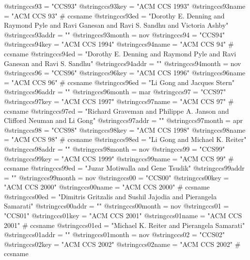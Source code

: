 @string{ccs93 =                 "CCS93"}
@string{ccs93key =              "ACM CCS 1993"}
@string{ccs93name =             "ACM CCS 93" # ccsname}
@string{ccs93ed =               "Dorothy E. Denning and Raymond Pyle and Ravi Ganesan and Ravi S. Sandhu and Victoria Ashby"}
@string{ccs93addr =             ""}
@string{ccs93month =            nov}
@string{ccs94 =                 "CCS94"}
@string{ccs94key =              "ACM CCS 1994"}
@string{ccs94name =             "ACM CCS 94" # ccsname}
@string{ccs94ed =               "Dorothy E. Denning and Raymond Pyle and Ravi Ganesan and Ravi S. Sandhu"}
@string{ccs94addr =             ""}
@string{ccs94month =            nov}
@string{ccs96 =                 "CCS96"}
@string{ccs96key =              "ACM CCS 1996"}
@string{ccs96name =             "ACM CCS 96" # ccsname}
@string{ccs96ed =               "Li Gong and Jacques Stern"}
@string{ccs96addr =             ""}
@string{ccs96month =            mar}
@string{ccs97 =                 "CCS97"}
@string{ccs97key =              "ACM CCS 1997"}
@string{ccs97name =             "ACM CCS 97" # ccsname}
@string{ccs97ed =               "Richard Graveman and Philippe A. Janson and Clifford Neuman and Li Gong"}
@string{ccs97addr =             ""}
@string{ccs97month =            apr}
@string{ccs98 =                 "CCS98"}
@string{ccs98key =              "ACM CCS 1998"}
@string{ccs98name =             "ACM CCS 98" # ccsname}
@string{ccs98ed =               "Li Gong and Michael K. Reiter"}
@string{ccs98addr =             ""}
@string{ccs98month =            nov}
@string{ccs99 =                 "CCS99"}
@string{ccs99key =              "ACM CCS 1999"}
@string{ccs99name =             "ACM CCS 99" # ccsname}
@string{ccs99ed =               "Juzar Motiwalla and Gene Tsudik"}
@string{ccs99addr =             ""}
@string{ccs99month =            nov}
@string{ccs00 =                 "CCS00"}
@string{ccs00key =              "ACM CCS 2000"}
@string{ccs00name =             "ACM CCS 2000" # ccsname}
@string{ccs00ed =               "Dimitris Gritzalis and Sushil Jajodia and Pierangela Samarati"}
@string{ccs00addr =             ""}
@string{ccs00month =            nov}
@string{ccs01 =                 "CCS01"}
@string{ccs01key =              "ACM CCS 2001"}
@string{ccs01name =             "ACM CCS 2001" # ccsname}
@string{ccs01ed =               "Michael K. Reiter and Pierangela Samarati"}
@string{ccs01addr =             ""}
@string{ccs01month =            nov}
@string{ccs02 =                 "CCS02"}
@string{ccs02key =              "ACM CCS 2002"}
@string{ccs02name =             "ACM CCS 2002" # ccsname}

